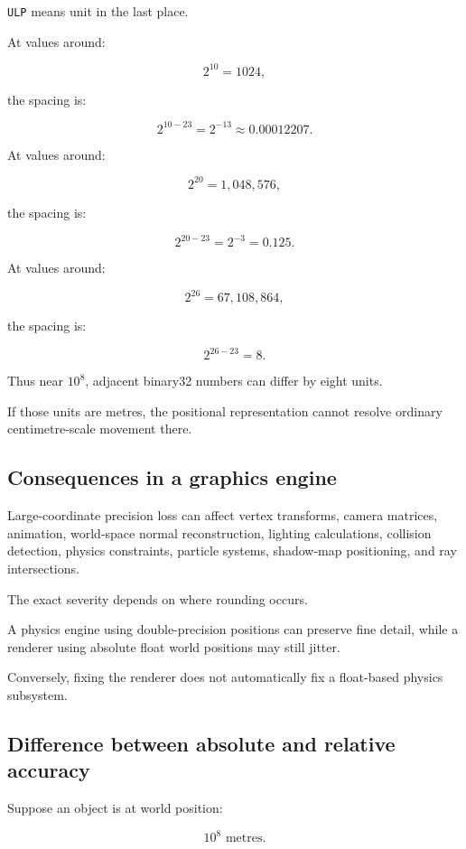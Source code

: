 \texttt{ULP} means unit in the last place.

At values around:

\[
 2^{10}=1024,
\]

the spacing is:

\[
 2^{10-23}=2^{-13} \approx0.00012207.
\]

At values around:

\[
 2^{20}=1{,}048{,}576,
\]

the spacing is:

\[
 2^{20-23}=2^{-3}=0.125.
\]

At values around:

\[
 2^{26}=67{,}108{,}864,
\]

the spacing is:

\[
 2^{26-23}=8.
\]

Thus near \(10^8\), adjacent binary32 numbers can differ by eight units.

If those units are metres, the positional representation cannot resolve ordinary centimetre-scale movement there.

\subsection{Consequences in a graphics engine}\label{02-foundations-ii-ch036-consequences-in-a-graphics-engine}

Large-coordinate precision loss can affect vertex transforms, camera matrices, animation, world-space normal reconstruction, lighting calculations, collision detection, physics constraints, particle systems, shadow-map positioning, and ray intersections.

The exact severity depends on where rounding occurs.

A physics engine using double-precision positions can preserve fine detail, while a renderer using absolute float world positions may still jitter.

Conversely, fixing the renderer does not automatically fix a float-based physics subsystem.

\subsection{Difference between absolute and relative accuracy}\label{02-foundations-ii-ch036-difference-between-absolute-and-relative-accuracy}

Suppose an object is at world position:

\[
 10^8\text{ metres}.
\]

